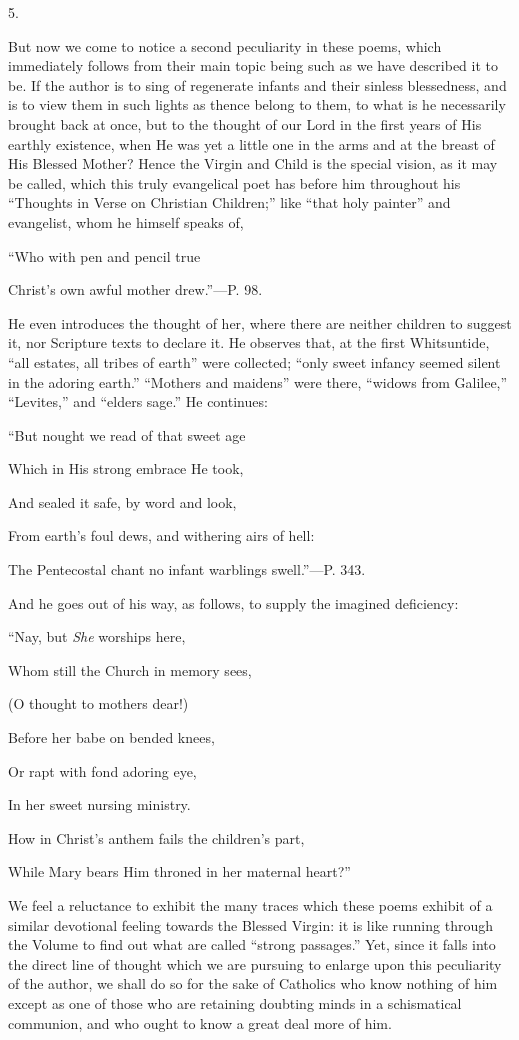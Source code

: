5.

But now we come to notice a second peculiarity in
these poems, which immediately follows from their main topic being
such as we have described it to be. If the author is to sing of
regenerate infants and their sinless blessedness, and is to view them
in such lights as thence belong to them, to what is he necessarily
brought back at once, but to the thought of our Lord in the first
years of His earthly existence, when He was yet a little one in the
arms and at the breast of His Blessed Mother? Hence the Virgin and
Child is the special vision, as it may be called, which this truly
evangelical poet has before him throughout his ``Thoughts in Verse on
Christian Children;'' like ``that holy painter'' and evangelist, whom he
himself speaks of,

``Who
with pen and pencil true

Christ's own awful mother drew.''—P. 98.

He even introduces the thought of her, where
there are neither children to suggest it, nor Scripture texts to
declare it. He observes that, at the first Whitsuntide, ``all estates,
all tribes of earth'' were collected; ``only sweet infancy seemed silent
in the adoring earth.'' ``Mothers and maidens'' were there, ``widows from
Galilee,'' ``Levites,'' and ``elders sage.'' He continues:

``But nought we read of that sweet age

Which in His
strong embrace He took,

And sealed it
safe, by word and look,

From earth's foul dews, and withering airs of hell:

The Pentecostal chant no infant warblings swell.''—P. 343.

And he goes out of his way, as follows, to supply
the imagined deficiency:

``Nay,
but \emph{She} worships here,

Whom still the Church in memory sees, 

(O thought to mothers dear!)

Before her babe
on bended knees,

Or rapt with
fond adoring eye,

In her sweet
nursing ministry.

How in Christ's anthem fails the children's part,

While Mary bears Him throned in her maternal heart?''

We feel a reluctance to exhibit the many traces
which these poems exhibit of a similar devotional feeling towards the
Blessed Virgin: it is like running through the Volume to find out what
are called ``strong passages.'' Yet, since it falls into the direct line
of thought which we are pursuing to enlarge upon this peculiarity of
the author, we shall do so for the sake of Catholics who know nothing
of him except as one of those who are retaining doubting minds in a
schismatical communion, and who ought to know a great deal more of
him.

